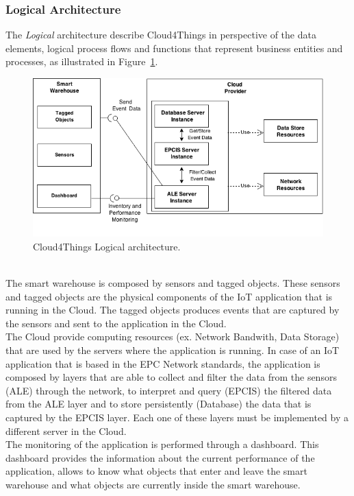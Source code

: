 \subsubsection{Logical Architecture}
\label{subs:logical_architecture}
The \textit{Logical} architecture describe Cloud4Things in perspective of
the data elements, logical process flows and functions that represent business
entities and processes, as illustrated in Figure~\ref{fig:logical_architecture}.
\begin{figure}[h!]
  \centering
  \includegraphics[width=\textwidth]{./images/logical-architecture}
  \caption{Cloud4Things Logical architecture.}
  \label{fig:logical_architecture}
  \end{figure}\\
The smart warehouse is composed by sensors and tagged objects. These sensors and tagged
objects are the physical components of the IoT application that is running in the Cloud.
The tagged objects produces events that are captured by the sensors and sent to the
application in the Cloud.\\

The Cloud provide computing resources (ex. Network Bandwith, Data Storage) that
are used by the servers where the application is running. In case of an IoT
application that is based in the EPC Network standards, the application is composed
by layers that are able to collect and filter the data from the sensors (ALE) through
the network, to interpret and query (EPCIS) the filtered data from the ALE layer and
to store persistently (Database) the data that is captured by the EPCIS layer.
Each one of these layers must be implemented by a different server in the Cloud.\\

The monitoring of the application is performed through a dashboard. This dashboard
provides the information about the current performance of the application,
allows to know what objects that enter and leave the smart warehouse and what
objects are currently inside the smart warehouse.
